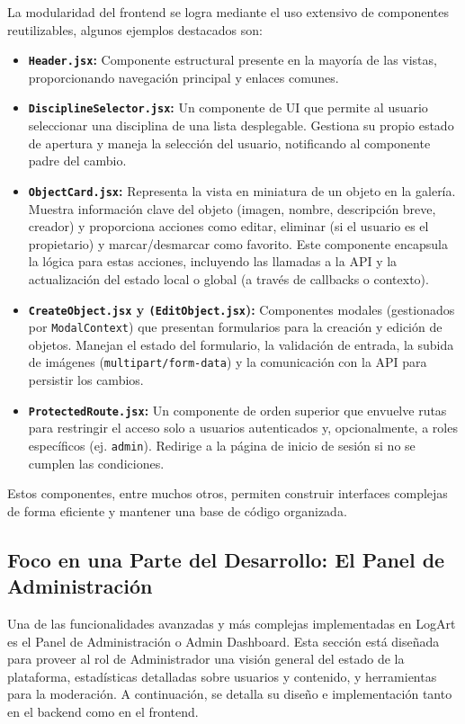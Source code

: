 La modularidad del frontend se logra mediante el uso extensivo de componentes reutilizables, algunos ejemplos destacados son:
\begin{itemize}
    \item \textbf{\texttt{Header.jsx}: } Componente estructural presente en la mayoría de las vistas, proporcionando navegación principal y enlaces comunes.
    \item \textbf{\texttt{DisciplineSelector.jsx}:} Un componente de UI que permite al usuario seleccionar una disciplina de una lista desplegable. Gestiona su propio estado de apertura y maneja la selección del usuario, notificando al componente padre del cambio.
    \item \textbf{\texttt{ObjectCard.jsx}:} Representa la vista en miniatura de un objeto en la galería. Muestra información clave del objeto (imagen, nombre, descripción breve, creador) y proporciona acciones como editar, eliminar (si el usuario es el propietario) y marcar/desmarcar como favorito. Este componente encapsula la lógica para estas acciones, incluyendo las llamadas a la API y la actualización del estado local o global (a través de callbacks o contexto).
    \item \textbf{\texttt{CreateObject.jsx} y \texttt{(EditObject.jsx}):} Componentes modales (gestionados por \texttt{ModalContext}) que presentan formularios para la creación y edición de objetos. Manejan el estado del formulario, la validación de entrada, la subida de imágenes (\texttt{multipart/form-data}) y la comunicación con la API para persistir los cambios.
    \item \textbf{\texttt{ProtectedRoute.jsx}:} Un componente de orden superior que envuelve rutas para restringir el acceso solo a usuarios autenticados y, opcionalmente, a roles específicos (ej. \texttt{admin}). Redirige a la página de inicio de sesión si no se cumplen las condiciones.
\end{itemize}

Estos componentes, entre muchos otros, permiten construir interfaces complejas de forma eficiente y mantener una base de código organizada.

\subsection{Foco en una Parte del Desarrollo: El Panel de Administración}
\label{ssec:focoAdminDashboard}

Una de las funcionalidades avanzadas y más complejas implementadas en LogArt es el Panel de Administración o Admin Dashboard. Esta sección está diseñada para proveer al rol de Administrador una visión general del estado de la plataforma, estadísticas detalladas sobre usuarios y contenido, y herramientas para la moderación. A continuación, se detalla su diseño e implementación tanto en el backend como en el frontend.
